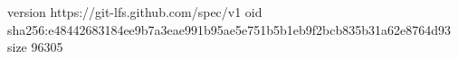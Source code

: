 version https://git-lfs.github.com/spec/v1
oid sha256:e48442683184ee9b7a3eae991b95ae5e751b5b1eb9f2bcb835b31a62e8764d93
size 96305
